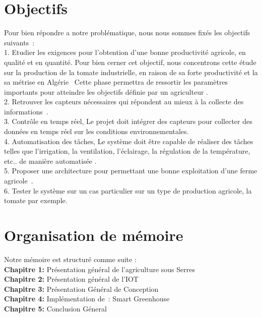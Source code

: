 \section*{Objectifs }
Pour bien répondre a notre problématique, nous nous sommes fixés les objectifs suivants : 
\\
	1.	Etudier les exigences pour l’obtention d’une bonne productivité agricole, en qualité et en quantité. Pour bien cerner cet objectif, nous concentrons cette étude sur la production de la 
tomate industrielle, en raison de sa forte productivité et la sa métrise en Algérie  Cette phase permettra de ressortir les paramètres importants pour atteindre les objectifs définie par un agriculteur .
\\
	2.	Retrouver les capteurs nécessaires qui répondent au mieux à la collecte des informations .
\\
    3. Contrôle en temps réel, Le projet doit intégrer des capteurs pour collecter des données en temps réel sur les conditions environnementales.
\\
    4.	Automatisation des tâches, Le système doit être capable de réaliser des tâches telles que l'irrigation, la ventilation, l'éclairage, la régulation de la température, etc..  de manière automatisée .
\\
    5.	Proposer une architecture pour permettant une bonne exploitation d’une ferme agricole .
\\
    6.	Tester le système sur un cas particulier sur un type de production agricole, la tomate par exemple.  

\section*{Organisation de mémoire }
Notre mémoire est structuré comme suite : 
\\
\textbf{Chapitre 1: }
Présentation général de l’agriculture sous Serres
\\
\textbf{Chapitre 2: }
Présentation général de l’IOT
\\
\textbf{Chapitre 3: }
Présentation Général de Conception
\\
\textbf{Chapitre 4: }
Implémentation de : Smart Greenhouse
\\
\textbf{Chapitre 5:}
Conclusion Géneral